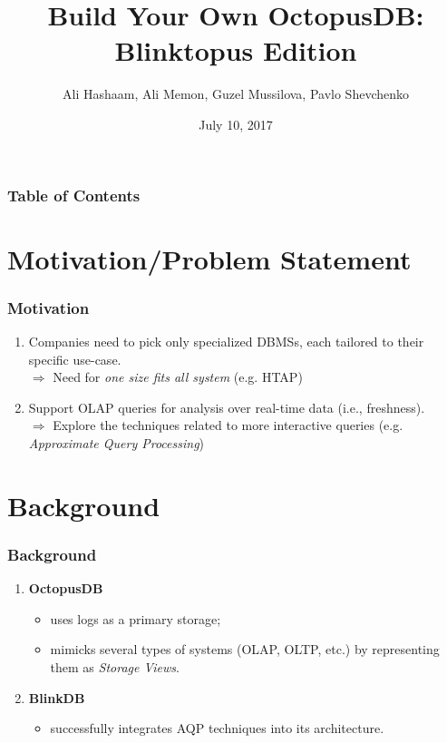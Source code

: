 \documentclass{beamer}
\title{Build Your Own OctopusDB: Blinktopus Edition}
\author{Ali Hashaam, Ali Memon, Guzel Mussilova, Pavlo Shevchenko}
\date{July 10, 2017}
\institute{Scientific Project: Databases for Multi-Dimensional Data, Genomics and Modern Hardware}
\begin{document}
\begin{frame}[plain]
 \titlepage
\end{frame}

\begin{frame}
\frametitle{Table of Contents}
\tableofcontents
\end{frame}

\section{Motivation/Problem Statement}
\begin{frame}
\frametitle{Motivation}
\begin{enumerate}
\item{Companies need to pick only specialized DBMSs, each tailored to their specific use-case. \\ \pause
$\Rightarrow$ Need for \emph{one size fits all system} (e.g. HTAP)}
\pause
\item{Support OLAP queries for analysis over real-time data (i.e., freshness). \\ \pause
$\Rightarrow$ Explore the techniques related to more interactive queries (e.g. \emph{Approximate Query Processing})}
\end{enumerate}
\end{frame}

\section{Background}
\begin{frame}
\frametitle{Background}
\begin{enumerate}
\item{\textbf{OctopusDB}} \pause
\begin{itemize}
\item{uses logs as a primary storage;} \pause
\item{mimicks several types of systems (OLAP, OLTP, etc.) by representing them as \emph{Storage Views}.}
\end{itemize}
\pause
\item{\textbf{BlinkDB}}
\begin{itemize}
\item{successfully integrates AQP techniques into its architecture.}
\end{itemize}
\end{enumerate}
\end{frame}
\end{document}
